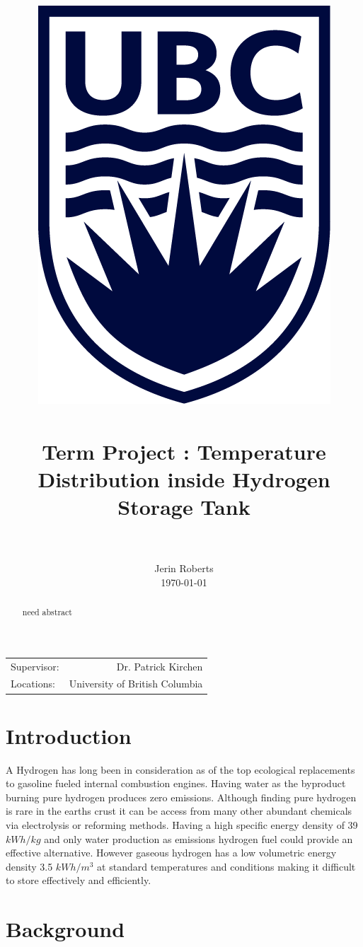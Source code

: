 \documentclass[paper=a4, fontsize=11pt, abstract=on]{scrartcl}
\title{
		\usefont{OT1}{bch}{b}{n}
		\normalfont \normalsize \textsc{} \\ [25pt]
		\includegraphics[width=0.2\linewidth]{ubc.png} \\
		\horrule{0.5pt} \\[0.2cm]
		\huge Term Project : Temperature Distribution inside Hydrogen Storage Tank \\
		\horrule{2pt} \\[0.005cm]
}
\author{
		\normalfont 								\normalsize
        Jerin Roberts\\[-5pt]		\normalsize
        \today
}
\date{}
\numberwithin{equation}{section}		%
\numberwithin{figure}{section}			%
\numberwithin{table}{section}				%
\begin{document}
\maketitle
\begin{center}
\begin{tabular}{l r}


Supervisor: & Dr. Patrick Kirchen  \\ %
Locations: & University of British Columbia


\end{tabular}
\end{center}
\newpage
\begin{abstract}
  need abstract
\end{abstract}


\newpage
\tableofcontents
\listoffigures
\listoftables
\newpage
\lstset{language=[Visual]C++}

\mbox{}%

 



 
\printnomenclature

\newpage

\section{Introduction}


A Hydrogen has long been in consideration as of the top ecological replacements to gasoline fueled internal combustion engines. Having water as the byproduct burning pure hydrogen produces zero emissions. Although finding pure hydrogen is rare in the earths crust it can be access from many other abundant chemicals via electrolysis or reforming methods. Having a high specific energy density of 39 $kWh/kg$ and only water production as emissions hydrogen fuel could provide an effective alternative. However gaseous hydrogen has a low volumetric energy density 3.5 $kWh/m^3$ at standard temperatures  and conditions making it difficult to store effectively and efficiently. 

\section{Background}
\end{document}
